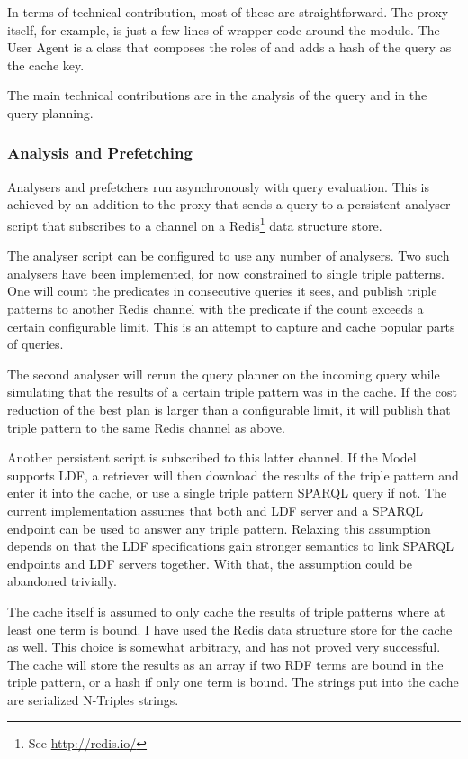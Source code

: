 In terms of technical contribution, most of these are
straightforward. The proxy itself, for example, is just a few lines of
wrapper code around the  module. The User
Agent is a class that composes the roles of
 and adds a hash of the query as
the cache key.

The main technical contributions are in the analysis of the query and
in the query planning.

\subsubsection{Analysis and Prefetching}\label{sec:analpre}

Analysers and prefetchers run asynchronously with query
evaluation. This is achieved by an addition to the proxy that sends a
query to a persistent analyser script that subscribes to a channel on
a Redis\footnote{See \url{http://redis.io/}} data structure store. 

The analyser script can be configured to use any number of analysers.
Two such analysers have been implemented, for now constrained to
single triple patterns. One will count the predicates in consecutive
queries it sees, and publish triple patterns to another Redis channel
with the predicate if the count exceeds a certain configurable
limit. This is an attempt to capture and cache popular parts of
queries.

The second analyser will rerun the query planner on the incoming query
while simulating that the results of a certain triple pattern was in
the cache. If the cost reduction of the best plan is larger than a
configurable limit, it will publish that triple pattern to the same
Redis channel as above. 

Another persistent script is subscribed to this latter channel. If the
Model supports LDF, a retriever will then download
the results of the triple pattern and enter it into the cache, or use
a single triple pattern SPARQL query if not. The current
implementation assumes that both and LDF server and a SPARQL endpoint
can be used to answer any triple pattern. Relaxing this assumption
depends on that the LDF specifications gain stronger semantics to link
SPARQL endpoints and LDF servers together. With that, the assumption
could be abandoned trivially.

The cache itself is assumed to only cache the results of triple
patterns where at least one term is bound. 
I have used the Redis data structure store for the
cache as well. This choice is somewhat arbitrary, and has not proved
very successful. The cache will store the results as an array if two
RDF terms are bound in the triple pattern, or a hash if only one term
is bound. The strings put into the cache are serialized N-Triples
strings.

